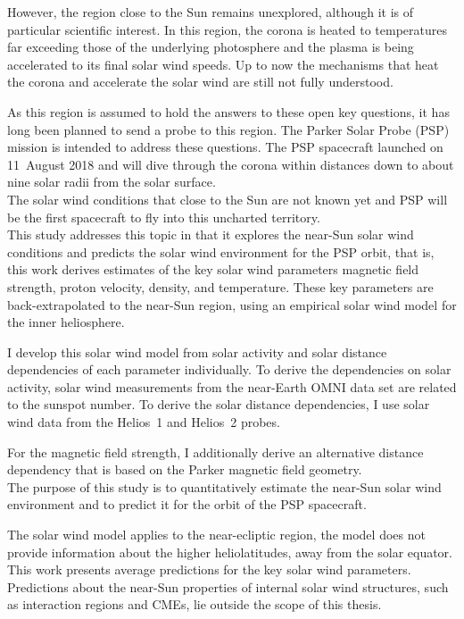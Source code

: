 However, the region close to the Sun remains unexplored, although it is of particular scientific interest. In this region, the corona is heated to temperatures far exceeding those of the underlying photosphere and the plasma is being accelerated to its final solar wind speeds. Up to now the mechanisms that heat the corona and accelerate the solar wind are still not fully understood.

As this region is assumed to hold the answers to these open key questions, it has long been planned to send a probe to this region. The Parker Solar Probe (PSP) mission is intended to address these questions. The PSP spacecraft launched on 11~August 2018 and will dive through the corona within distances down to about nine solar radii from the solar surface.\\

The solar wind conditions that close to the Sun are not known yet and PSP will be the first spacecraft to fly into this uncharted territory.\\

This study addresses this topic in that it explores the near-Sun solar wind conditions and predicts the solar wind environment for the PSP orbit, that is, this work derives estimates of the key solar wind parameters magnetic field strength, proton velocity, density, and temperature. These key parameters are back-extrapolated to the near-Sun region, using an empirical solar wind model for the inner heliosphere.

I develop this solar wind model from solar activity and solar distance dependencies of each parameter individually. To derive the dependencies on solar activity, solar wind measurements from the near-Earth OMNI data set are related to the sunspot number. To derive the solar distance dependencies, I use solar wind data from the Helios~1 and Helios~2 probes.

For the magnetic field strength, I additionally derive an alternative distance dependency that is based on the Parker magnetic field geometry.\\

The purpose of this study is to quantitatively estimate the near-Sun solar wind environment and to predict it for the orbit of the PSP spacecraft.

The solar wind model applies to the near-ecliptic region, the model does not provide information about the higher heliolatitudes, away from the solar equator.
This work presents average predictions for the key solar wind parameters. Predictions about the near-Sun properties of internal solar wind structures, such as interaction regions and CMEs, lie outside the scope of this thesis.\\

